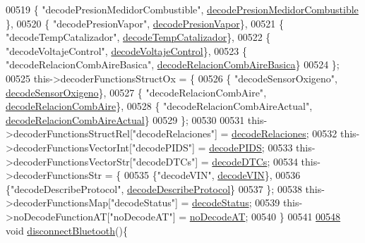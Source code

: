 \begin{DoxyCode}
{{{{{{{{{{{{{{00519             \{ \textcolor{stringliteral}{"decodePresionMedidorCombustible"}, \hyperlink{decoders_8cpp_a228605d8cad0901a691ba4155a2326fc}{decodePresionMedidorCombustible}
      \},
00520             \{ \textcolor{stringliteral}{"decodePresionVapor"}, \hyperlink{decoders_8cpp_ab86bda1fcefda784e048796e2d892475}{decodePresionVapor}\},
00521             \{ \textcolor{stringliteral}{"decodeTempCatalizador"}, \hyperlink{decoders_8cpp_a8251853ca2e5b8b2e88c75f50d53bc8d}{decodeTempCatalizador}\},
00522             \{ \textcolor{stringliteral}{"decodeVoltajeControl"}, \hyperlink{decoders_8cpp_a5937fc059394faad8c9c96a0b27a8796}{decodeVoltajeControl}\},
00523             \{ \textcolor{stringliteral}{"decodeRelacionCombAireBasica"}, \hyperlink{decoders_8cpp_ade77bb9f8d8a2ba3aa431cdf9bdd0c32}{decodeRelacionCombAireBasica}\}
00524         \};
00525         this->decoderFunctionsStructOx = \{
00526             \{ \textcolor{stringliteral}{"decodeSensorOxigeno"}, \hyperlink{decoders_8cpp_a5b53fc5fc37fbee9c5e389f6c8c18438}{decodeSensorOxigeno}\},
00527             \{ \textcolor{stringliteral}{"decodeRelacionCombAire"}, \hyperlink{decoders_8cpp_a363bd4f505969098be58a175f02b9b50}{decodeRelacionCombAire}\},
00528             \{ \textcolor{stringliteral}{"decodeRelacionCombAireActual"}, \hyperlink{decoders_8cpp_a4cedb500095b25b3d4fff382094b0eb9}{decodeRelacionCombAireActual}\}
00529         \};
00530 
00531         this->decoderFunctionsStructRel[\textcolor{stringliteral}{"decodeRelaciones"}] = \hyperlink{decoders_8cpp_a88d7079325bf81705583d9f2101cfa15}{decodeRelaciones};
00532         this->decoderFunctionsVectorInt[\textcolor{stringliteral}{"decodePIDS"}] = \hyperlink{decoders_8cpp_aef44cca306ed9c74b146d2b7dd058763}{decodePIDS};
00533         this->decoderFunctionsVectorStr[\textcolor{stringliteral}{"decodeDTCs"}] = \hyperlink{decoders_8cpp_aac9b3d4ea17ee4dbbdf755b0b510137a}{decodeDTCs};
00534         this->decoderFunctionsStr = \{
00535             \{\textcolor{stringliteral}{"decodeVIN"}, \hyperlink{decoders_8cpp_a66754738119854c13a74265e209083e4}{decodeVIN}\},
00536             \{\textcolor{stringliteral}{"decodeDescribeProtocol"}, \hyperlink{decoders_8cpp_ab83ce79cd098ea655f3812488e304a0c}{decodeDescribeProtocol}\}
00537         \};
00538         this->decoderFunctionsMap[\textcolor{stringliteral}{"decodeStatus"}] = \hyperlink{decoders_8cpp_aca9cad863d8603615597a0291804c8ae}{decodeStatus};
00539         this->noDecodeFunctionAT[\textcolor{stringliteral}{"noDecodeAT"}] = \hyperlink{decoders_8cpp_a8ee851a37675f190ea728d6b2f0cdc92}{noDecodeAT};
00540     \}
00541 
\hyperlink{classObd_a95d02f8f3c48557c5ad799ecb6dd7f79}{00548}     \textcolor{keywordtype}{void} \hyperlink{classObd_a95d02f8f3c48557c5ad799ecb6dd7f79}{disconnectBluetooth}()\{
}}}}}}}}}}}}}}
\end{DoxyCode}
